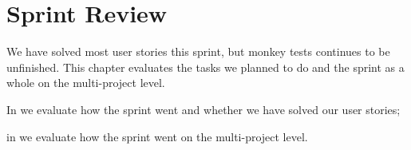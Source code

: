 \chapter{Sprint Review}\label{chap:sprint2_end}
We have solved most user stories this sprint, but monkey tests continues to be unfinished. This chapter evaluates the tasks we planned to do and the sprint as a whole on the multi-project level.

\begin{chapterorganization}
  \item In  we evaluate how the sprint went and whether we have solved our user stories;
  \item in  we evaluate how the sprint went on the multi-project level.
\end{chapterorganization}


